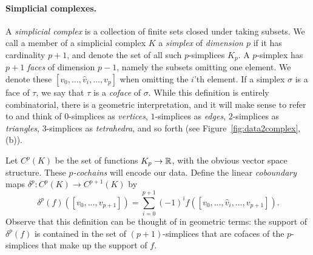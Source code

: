 \paragraph{Simplicial complexes.} 
A \emph{simplicial complex} is a collection of finite sets closed under taking subsets.
We call a member of a simplicial complex $K$ a \emph{simplex} of \emph{dimension $p$} if it has cardinality $p+1$, and denote the set of all such $p$-simplices $K_p$.
A $p$-simplex has $p+1$ \emph{faces} of dimension $p-1$, namely the subsets omitting one element. We denote these $[v_0,\dotsc,\hat{v}_i,\dotsc, v_p]$ when omitting the $i$'th element.
If a simplex $\sigma$ is a face of $\tau$, we say that $\tau$ is a \emph{coface} of $\sigma$. While this definition is entirely combinatorial, there is a geometric interpretation, and it will make sense to refer to and think of $0$-simplices as \emph{vertices}, $1$-simplices as \emph{edges}, $2$-simplices as \emph{triangles}, $3$-simplices as \emph{tetrahedra}, and so forth (see Figure~\ref{fig:data2complex}, (b)).

Let $C^p(K)$ be the set of functions $K_p\to\mathbb{R}$, with the obvious vector space structure. These \emph{$p$-cochains} will encode our data. Define the linear \emph{coboundary} maps $\delta^p:C^p(K)\to C^{p+1}(K)$ by
\begin{equation*}
\delta^p(f)([v_0,\dotsc,v_{p+1}]) = \sum_{i=0}^{p+1} (-1)^i f([v_0,\dotsc,\hat{v}_i,\dotsc,v_{p+1}]).
\end{equation*}
Observe that this definition can be thought of in geometric terms: the support of $\delta^p(f)$ is contained in the set of $(p+1)$-simplices that are cofaces of the $p$-simplices that make up the support of $f$.

